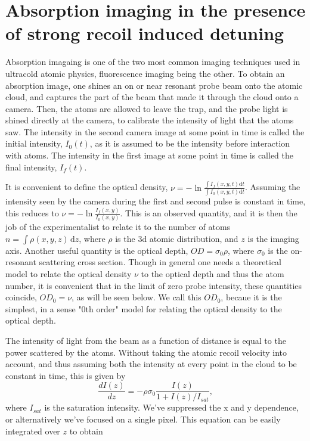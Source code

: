 \documentclass[12pt]{iopart}
\begin{document}
\section{Absorption imaging in the presence of strong recoil induced detuning}
Absorption imagaing is one of the two most common imaging techniques used in ultracold atomic physics, fluorescence imaging being the other. To obtain an absorption image, one shines an on or near resonant probe beam onto the atomic cloud, and captures the part of the beam that made it through the cloud onto a camera. Then, the atoms are allowed to leave the trap, and the probe light is shined directly at the camera, to calibrate the intensity of light that the atoms saw. The intensity in the second camera image at some point in time is called the initial intensity, $I_{0}(t)$, as it is assumed to be the intensity before interaction with atoms. The intensity in the first image at some point in time is called the final intensity, $I_f(t)$.  
\par It is convenient to define the optical density, $\nu=-\ln{\frac{\int{I_f(x,y,t)}\mathrm{d}t}{\int{I_0(x,y,t)}\mathrm{d}t}}$. Assuming the intensity seen by the camera during the first and second pulse is constant in time, this reduces to $\nu=-\ln{\frac{I_f(x,y)}{I_0(x,y)}}$. This is an observed quantity, and it is then the job of the experimentalist to relate it to the number of atoms $n = \int \rho\left(x,y,z\right) \,\mathrm{d}z$, where $\rho$ is the 3d atomic distribution, and $z$ is the imaging axis. Another useful quantity is the optical depth, $OD=\sigma_0\rho$, where $\sigma_0$ is the on-resonant scattering cross section. Though in general one needs a theoretical model to relate the optical density $\nu$ to the optical depth  and thus the atom number, it is convenient that in the limit of zero probe intensity, these quantities coincide, $OD_0=\nu$, as will be seen below. We call this $OD_0$, becaue it is the simplest, in a sense "0th order" model for relating the optical density to the optical depth.
\par The intensity of light from the beam as a function of distance is equal to the power scattered by the atoms. Without taking the atomic recoil velocity into account, and thus assuming both the intensity at every point in the cloud to be constant in time, this is given by \cite{Reinaudi07}
\begin{equation}
\frac{dI(z)}{dz}=-\rho\sigma_0\frac{I(z)}{1+I(z)/I_{sat}},
\end{equation}
 where  $I_{sat}$ is the saturation intensity. We've suppressed the x and y dependence, or alternatively we've focused on a single pixel.  This equation can be easily integrated over $z$ to obtain
\end{document}
